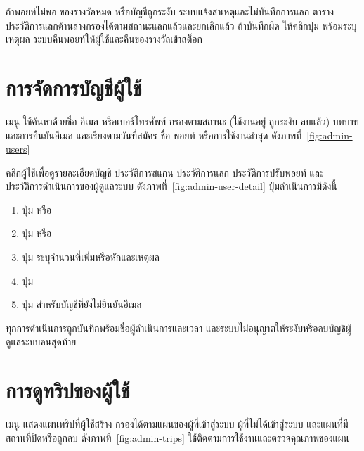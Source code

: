 ถ้าพอยท์ไม่พอ ของรางวัลหมด หรือบัญชีถูกระงับ ระบบแจ้งสาเหตุและไม่บันทึกการแลก ตารางประวัติการแลกด้านล่างกรองได้ตามสถานะแลกแล้วและยกเลิกแล้ว ถ้าบันทึกผิด ให้คลิกปุ่ม  พร้อมระบุเหตุผล ระบบคืนพอยท์ให้ผู้ใช้และคืนของรางวัลเข้าสต็อก

\section{การจัดการบัญชีผู้ใช้}
\label{sec:admin-users}

เมนู  ใช้ค้นหาด้วยชื่อ อีเมล หรือเบอร์โทรศัพท์ กรองตามสถานะ (ใช้งานอยู่ ถูกระงับ ลบแล้ว) บทบาท และการยืนยันอีเมล และเรียงตามวันที่สมัคร ชื่อ พอยท์ หรือการใช้งานล่าสุด ดังภาพที่~\ref{fig:admin-users}


คลิกผู้ใช้เพื่อดูรายละเอียดบัญชี ประวัติการสแกน ประวัติการแลก ประวัติการปรับพอยท์ และประวัติการดำเนินการของผู้ดูแลระบบ ดังภาพที่~\ref{fig:admin-user-detail} ปุ่มดำเนินการมีดังนี้


\begin{enumerate}
\item ปุ่ม  หรือ 
\item ปุ่ม  หรือ 
\item ปุ่ม  ระบุจำนวนที่เพิ่มหรือหักและเหตุผล
\item ปุ่ม 
\item ปุ่ม  สำหรับบัญชีที่ยังไม่ยืนยันอีเมล
\end{enumerate}

\begin{note}
ทุกการดำเนินการถูกบันทึกพร้อมชื่อผู้ดำเนินการและเวลา และระบบไม่อนุญาตให้ระงับหรือลบบัญชีผู้ดูแลระบบคนสุดท้าย
\end{note}

\section{การดูทริปของผู้ใช้}

เมนู  แสดงแผนทริปที่ผู้ใช้สร้าง กรองได้ตามแผนของผู้ที่เข้าสู่ระบบ ผู้ที่ไม่ได้เข้าสู่ระบบ และแผนที่มีสถานที่ปิดหรือถูกลบ ดังภาพที่~\ref{fig:admin-trips} ใช้ติดตามการใช้งานและตรวจคุณภาพของแผน



